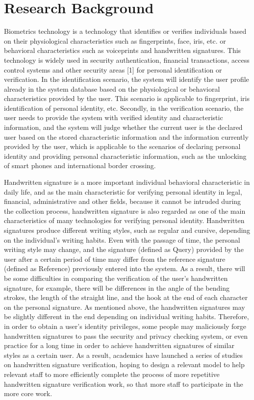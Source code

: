 \section{Research Background}
Biometrics technology is a technology that identifies or verifies individuals based on their physiological characteristics such as fingerprints, face, iris, etc. or behavioral characteristics such as voiceprints and handwritten signatures. This technology is widely used in security authentication, financial transactions, access control systems and other security areas [1] for personal identification or verification. In the identification scenario, the system will identify the user profile already in the system database based on the physiological or behavioral characteristics provided by the user. This scenario is applicable to fingerprint, iris identification of personal identity, etc. Secondly, in the verification scenario, the user needs to provide the system with verified identity and characteristic information, and the system will judge whether the current user is the declared user based on the stored characteristic information and the information currently provided by the user, which is applicable to the scenarios of declaring personal identity and providing personal characteristic information, such as the unlocking of smart phones and international border crossing.

Handwritten signature is a more important individual behavioral characteristic in daily life, and as the main characteristic for verifying personal identity in legal, financial, administrative and other fields, because it cannot be intruded during the collection process, handwritten signature is also regarded as one of the main characteristics of many technologies for verifying personal identity. Handwritten signatures produce different writing styles, such as regular and cursive, depending on the individual's writing habits. Even with the passage of time, the personal writing style may change, and the signature (defined as Query) provided by the user after a certain period of time may differ from the reference signature (defined as Reference) previously entered into the system. As a result, there will be some difficulties in comparing the verification of the user's handwritten signature, for example, there will be differences in the angle of the bending strokes, the length of the straight line, and the hook at the end of each character on the personal signature. As mentioned above, the handwritten signatures may be slightly different in the end depending on individual writing habits. Therefore, in order to obtain a user's identity privileges, some people may maliciously forge handwritten signatures to pass the security and privacy checking system, or even practice for a long time in order to achieve handwritten signatures of similar styles as a certain user. As a result, academics have launched a series of studies on handwritten signature verification, hoping to design a relevant model to help relevant staff to more efficiently complete the process of more repetitive handwritten signature verification work, so that more staff to participate in the more core work.

